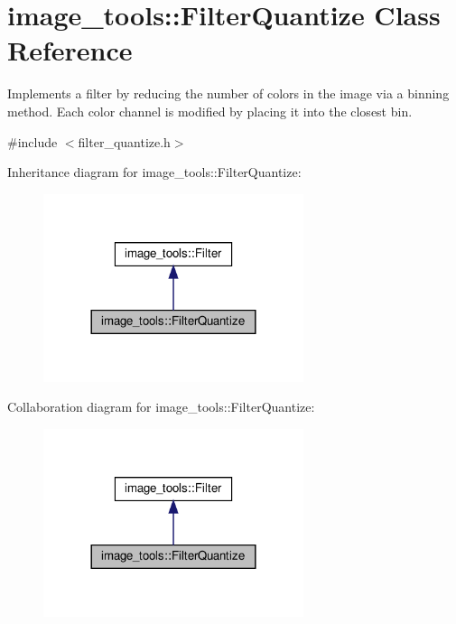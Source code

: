 \hypertarget{classimage__tools_1_1FilterQuantize}{}\section{image\+\_\+tools\+:\+:Filter\+Quantize Class Reference}
\label{classimage__tools_1_1FilterQuantize}


Implements a filter by reducing the number of colors in the image via a binning method. Each color channel is modified by placing it into the closest bin.  




{\ttfamily \#include $<$filter\+\_\+quantize.\+h$>$}



Inheritance diagram for image\+\_\+tools\+:\+:Filter\+Quantize\+:
\nopagebreak
\begin{figure}[H]
\begin{center}
\leavevmode
\includegraphics[width=216pt]{classimage__tools_1_1FilterQuantize__inherit__graph}
\end{center}
\end{figure}


Collaboration diagram for image\+\_\+tools\+:\+:Filter\+Quantize\+:
\nopagebreak
\begin{figure}[H]
\begin{center}
\leavevmode
\includegraphics[width=216pt]{classimage__tools_1_1FilterQuantize__coll__graph}
\end{center}
\end{figure}
